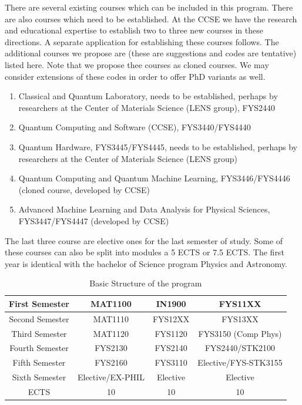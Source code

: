 \documentclass[aps,rmp,preprint,amsmath,amssymb,graphicx,longbibliography]{revtex4-1}
\begin{document}
There are several existing courses which can be included in this program. There are also courses which need to be established. At the CCSE we have the research and educational expertise to establish two to three new courses in these directions.
A separate application for establishing these courses follows. The additional courses we propose are (these are suggestions and codes are tentative) listed here. Note that we propose thee courses as cloned courses. We may consider extensions of these codes in order to offer PhD variants as well.



\begin{enumerate}
    \item Classical and Quantum Laboratory, needs to be established, perhaps by researchers at the Center of Materials Science (LENS group), FYS2440
    \item Quantum Computing and Software (CCSE), FYS3440/FYS4440
    \item Quantum Hardware, FYS3445/FYS4445, needs to be established, perhaps by researchers at the Center of Materials Science (LENS group)
    \item Quantum Computing and Quantum Machine Learning, FYS3446/FYS4446 (cloned course, developed by CCSE)
    \item Advanced Machine Learning and Data Analysis for Physical Sciences, FYS3447/FYS4447 (developed by CCSE)
\end{enumerate}

The last three course are elective ones for the last semester of study. Some of these courses can also be split into modules a 5 ECTS or 7.5 ECTS.
The first year is identical with the bachelor of Science program Physics and Astronomy.

\begin{table}
 \caption{Basic Structure of the program}
    \centering
    \begin{tabular}{|c|c|c|c|} \hline
    First Semester & MAT1100 &  IN1900   & FYS11XX  \\ \hline 
    Second Semester & MAT1110 & FYS12XX  & FYS13XX \\ \hline
    Third Semester & MAT1120 &   FYS1120  &  FYS3150 (Comp Phys)\\ \hline
    Fourth Semester & FYS2130 & FYS2140    & FYS2440/STK2100 \\ \hline       
    Fifth Semester & FYS2160 & FYS3110     & Elective/FYS-STK3155 \\ \hline
    Sixth Semester & Elective/EX-PHIL & Elective    & Elective \\ \hline
   ECTS & 10 &  10   &  10  \\ \hline    
    \end{tabular}
\end{table}



\end{document}
